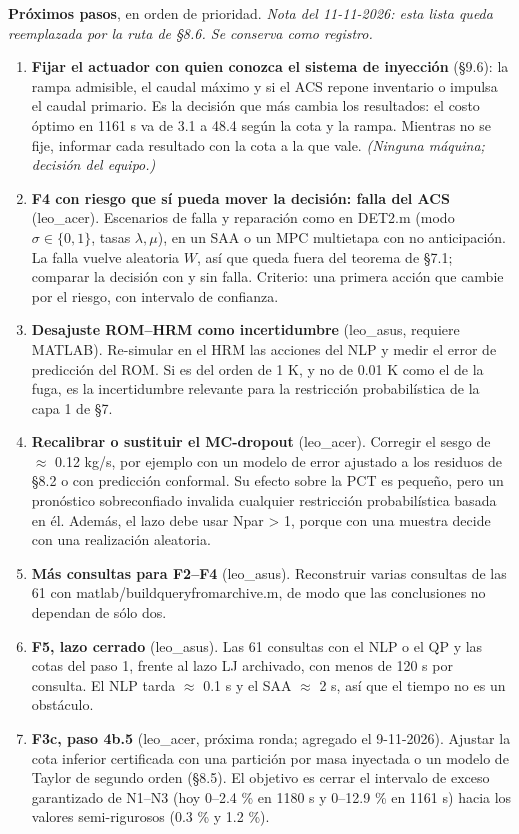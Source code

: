 \documentclass[11pt,a4paper]{article}
\newcommand{\codeus}{\textunderscore\allowbreak}
\newcommand{\code}[1]{{\small\ttfamily\let\_\codeus #1}}
\begin{document}
\textbf{Próximos pasos}, en orden de prioridad. \emph{Nota del 11-11-2026: esta lista queda reemplazada por la ruta de \S{}8.6. Se conserva como registro.}

\begin{enumerate}
\item \textbf{Fijar el actuador con quien conozca el sistema de inyección} (\S{}9.6): la rampa admisible, el caudal máximo y si el ACS repone inventario o impulsa el caudal primario. Es la decisión que más cambia los resultados: el costo óptimo en 1161 s va de 3.1 a 48.4 según la cota y la rampa. Mientras no se fije, informar cada resultado con la cota a la que vale. \emph{(Ninguna máquina; decisión del equipo.)}
\item \textbf{F4 con riesgo que sí pueda mover la decisión: falla del ACS} (leo\_acer). Escenarios de falla y reparación como en \code{DET\_2.m} (modo $\sigma\in\{0,1\}$, tasas $\lambda,\mu$), en un SAA o un MPC multietapa con no anticipación. La falla vuelve aleatoria $W$, así que queda fuera del teorema de \S{}7.1; comparar la decisión con y sin falla. Criterio: una primera acción que cambie por el riesgo, con intervalo de confianza.
\item \textbf{Desajuste ROM–HRM como incertidumbre} (leo\_asus, requiere MATLAB). Re-simular en el HRM las acciones del NLP y medir el error de predicción del ROM. Si es del orden de 1 K, y no de 0.01 K como el de la fuga, es la incertidumbre relevante para la restricción probabilística de la capa 1 de \S{}7.
\item \textbf{Recalibrar o sustituir el MC-dropout} (leo\_acer). Corregir el sesgo de $\approx$ 0.12 kg/s, por ejemplo con un modelo de error ajustado a los residuos de \S{}8.2 o con predicción conformal. Su efecto sobre la PCT es pequeño, pero un pronóstico sobreconfiado invalida cualquier restricción probabilística basada en él. Además, el lazo debe usar \code{N\_par} > 1, porque con una muestra decide con una realización aleatoria.
\item \textbf{Más consultas para F2–F4} (leo\_asus). Reconstruir varias consultas de las 61 con \code{matlab/build\_query\_from\_archive.m}, de modo que las conclusiones no dependan de sólo dos.
\item \textbf{F5, lazo cerrado} (leo\_asus). Las 61 consultas con el NLP o el QP y las cotas del paso 1, frente al lazo LJ archivado, con menos de 120 s por consulta. El NLP tarda $\approx$ 0.1 s y el SAA $\approx$ 2 s, así que el tiempo no es un obstáculo.
\item \textbf{F3c, paso 4b.5} (leo\_acer, próxima ronda; agregado el 9-11-2026). Ajustar la cota inferior certificada con una partición por masa inyectada o un modelo de Taylor de segundo orden (\S{}8.5). El objetivo es cerrar el intervalo de exceso garantizado de N1–N3 (hoy 0–2.4 \% en 1180 s y 0–12.9 \% en 1161 s) hacia los valores semi-rigurosos (0.3 \% y 1.2 \%).
\end{enumerate}
\end{document}
